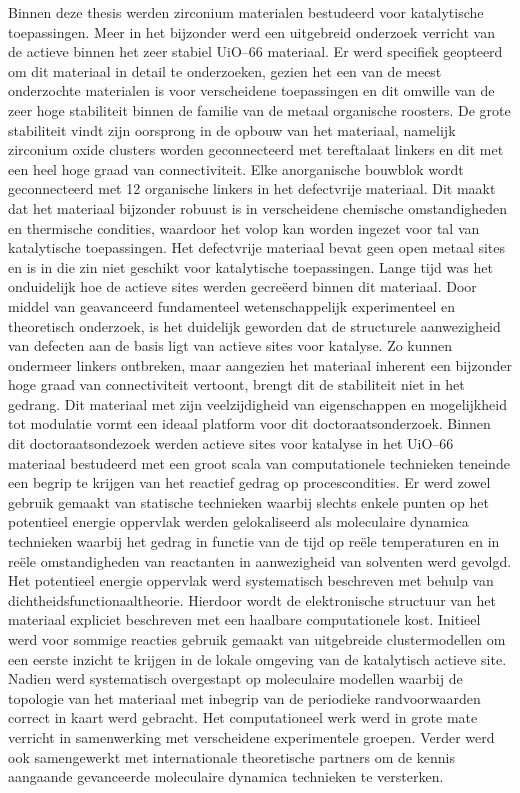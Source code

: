 Binnen deze thesis werden zirconium materialen bestudeerd voor katalytische toepassingen. Meer in het bijzonder werd een uitgebreid onderzoek verricht van de actieve binnen het zeer stabiel UiO--66 materiaal. Er werd specifiek geopteerd om dit materiaal in detail te onderzoeken, gezien het een van de meest onderzochte materialen is voor verscheidene toepassingen en dit omwille van de zeer hoge stabiliteit binnen de familie van de metaal organische roosters. De grote stabiliteit vindt zijn oorsprong in de opbouw van het materiaal, namelijk zirconium oxide clusters worden geconnecteerd met tereftalaat linkers en dit met een heel hoge graad van connectiviteit. Elke anorganische bouwblok wordt geconnecteerd met 12 organische linkers in het defectvrije materiaal. Dit maakt dat het materiaal bijzonder robuust is in verscheidene chemische omstandigheden en thermische condities, waardoor het volop kan worden ingezet voor tal van katalytische toepassingen. Het defectvrije materiaal bevat geen open metaal sites en is in die zin niet geschikt voor katalytische toepassingen. Lange tijd was het onduidelijk hoe de actieve sites werden gecreëerd binnen dit materiaal. Door middel van geavanceerd fundamenteel wetenschappelijk experimenteel en theoretisch onderzoek, is het duidelijk geworden dat de structurele aanwezigheid van defecten aan de basis ligt van actieve sites voor katalyse. Zo kunnen ondermeer linkers ontbreken, maar aangezien het materiaal inherent een bijzonder hoge graad van connectiviteit vertoont, brengt dit de stabiliteit niet in het gedrang. Dit materiaal met zijn veelzijdigheid van eigenschappen en mogelijkheid tot modulatie vormt een ideaal platform voor dit doctoraatsonderzoek. 
\npar
Binnen dit doctoraatsondezoek werden actieve sites voor katalyse in het UiO--66 materiaal bestudeerd met een groot scala van computationele technieken teneinde een begrip te krijgen van het reactief gedrag op procescondities. Er werd zowel gebruik gemaakt van statische technieken waarbij slechts enkele punten op het potentieel energie oppervlak werden gelokaliseerd als moleculaire dynamica technieken waarbij het gedrag in functie van de tijd op reële temperaturen en in reële omstandigheden van reactanten in aanwezigheid van solventen werd gevolgd. Het potentieel energie oppervlak werd systematisch beschreven met behulp van dichtheidsfunctionaaltheorie. Hierdoor wordt de elektronische structuur van het materiaal expliciet beschreven met een haalbare computationele kost. Initieel werd voor sommige reacties gebruik gemaakt van uitgebreide clustermodellen om een eerste inzicht te krijgen in de lokale omgeving van de katalytisch actieve site. Nadien werd systematisch overgestapt op moleculaire modellen waarbij de topologie van het materiaal met inbegrip van de periodieke randvoorwaarden correct in kaart werd gebracht. Het computationeel werk werd in grote mate verricht in samenwerking met verscheidene experimentele groepen. Verder werd ook samengewerkt met internationale theoretische partners om de kennis aangaande gevanceerde moleculaire dynamica technieken te versterken. 
